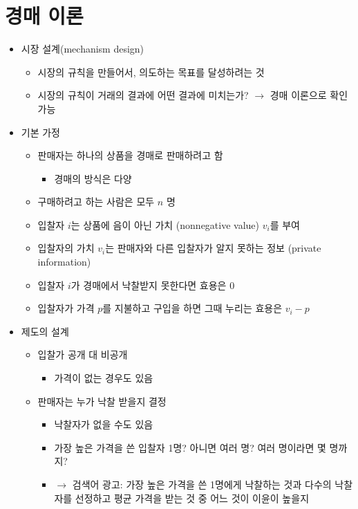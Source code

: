 \section{경매 이론}
\begin{itemize}
\item 시장 설계(mechanism design)
	\begin{itemize}
	\item 시장의 규칙을 만들어서, 의도하는 목표를 달성하려는 것
	\item 시장의 규칙이 거래의 결과에 어떤 결과에 미치는가? $\rightarrow$ 경매 이론으로 확인 가능
	\end{itemize}
\item 기본 가정 \cite[Lecture 2]{Roughgarden:2016aa}
	\begin{itemize}
	\item 판매자는 하나의 상품을 경매로 판매하려고 함
		\begin{itemize}
		\item 경매의 방식은 다양
		\end{itemize}
	\item 구매하려고 하는 사람은 모두 $n$ 명
	\item 입찰자 $i$는 상품에 음이 아닌 가치 (nonnegative value) $v_{i}$를 부여
	\item 입찰자의 가치 $v_{i}$는 판매자와 다른 입찰자가 알지 못하는 정보 (private information)
	\item 입찰자 $i$가 경매에서 낙찰받지 못한다면 효용은 0
	\item 입찰자가 가격 $p$를 지불하고 구입을 하면 그때 누리는 효용은 $v_{i} - p$
	\end{itemize}
\item 제도의 설계
	\begin{itemize}
	\item 입찰가 공개 대 비공개
		\begin{itemize}
		\item 가격이 없는 경우도 있음
		\end{itemize}
	\item 판매자는 누가 낙찰 받을지 결정
		\begin{itemize}
		\item 낙찰자가 없을 수도 있음
		\item 가장 높은 가격을 쓴 입찰자 1명? 아니면 여러 명? 여러 명이라면 몇 명까지?
		\item $\rightarrow$ 검색어 광고: 가장 높은 가격을 쓴 1명에게 낙찰하는 것과 다수의 낙찰자를 선정하고 평균 가격을 받는 것 중 어느 것이 이윤이 높을지
		\end{itemize}

\end{itemize}
\end{itemize}
